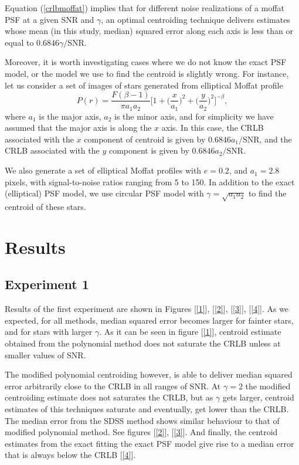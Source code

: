 \documentclass[12pt, preprint]{aastex}
\newcommand{\beq}{\begin{equation}}
\newcommand{\eeq}{\end{equation}}
\begin{document}
Equation (\ref{crlbmoffat}) implies that for different noise realizations of a moffat PSF at a given SNR and $\gamma$, an optimal centroiding technique delivers estimates whose mean (in this study, median) squared error along each axis is less than or equal to $0.6846 \gamma/\text{SNR}$.

Moreover, it is worth investigating cases where we do not know the exact PSF model, or the model we use to find the centroid is slightly wrong. For instance, let us consider a set of images of stars generated from elliptical Moffat profile
\beq
P(r) = \frac{F(\beta - 1)}{\pi a_{1}a_{2}}\Big[1+\Big(\frac{x}{a_{1}}\Big)^{2}+\Big(\frac{y}{a_{2}}\Big)^{2}\Big]^{-\beta},
\eeq    
where $a_{1}$ is the major axis, $a_{2}$ is the minor axis, and for simplicity we have assumed that the major axis is along the $x$ axis. In this case, the CRLB associated with  the $x$ component of centroid is given by $0.6846 a_{1}/\text{SNR}$, and the CRLB associated with the $y$ component is given by $0.6846 a_{2}/\text{SNR}$. 

We also generate a set of elliptical Moffat profiles with $e=0.2$, and $a_{1} = 2.8$ pixels, with signal-to-noise ratios ranging from 5 to 150. In addition to the exact (elliptical) PSF model, we use circular PSF model with $\gamma = \sqrt{a_{1}a_{2}}$ to find the centroid of these stars.

 
 


\section{Results}\label{sec:results}

\subsection{Experiment 1}
   
Results of the first experiment are shown in Figures [\ref{1}], [\ref{2}], [\ref{3}], [\ref{4}]. As we expected, for all methods, median squared error becomes larger for fainter stars, and for stars with larger $\gamma$. As it can be seen in figure [\ref{1}], centroid estimate obtained from the polynomial method does not saturate the CRLB unless at smaller values of SNR. 

The modified polynomial centroiding however, is able to deliver median squared error arbitrarily close to the CRLB in all ranges of SNR. At $\gamma = 2$ the modified centroiding estimate does not saturates the CRLB, but as $\gamma$ gets larger, centroid estimates of this techniques saturate and eventually, get lower than the CRLB. The median error from the SDSS method shows similar behaviour to that of modified polynomial method. See figures [\ref{2}], [\ref{3}]. And finally, the centroid estimates from the exact fitting the exact PSF model give rise to a median error that is always below the CRLB [\ref{4}].
\end{document}
